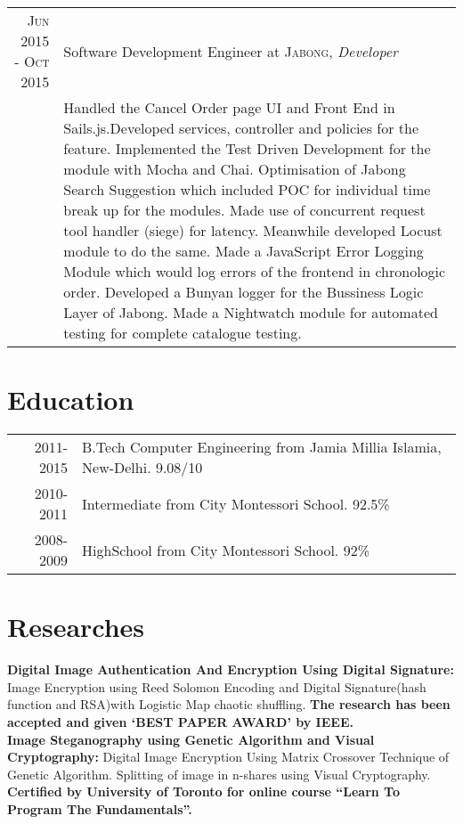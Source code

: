 \documentclass[a4paper,10pt]{article}
\begin{document}
\begin{tabular}{r|p{11cm}}
\textsc{Jun 2015 - Oct 2015} & Software Development Engineer at \textsc{Jabong}, \newline \emph{Developer}\\&\footnotesize{Handled the Cancel Order page UI and Front End in Sails.js.Developed services, controller and policies for the feature.\newline
Implemented the Test Driven Development for the module with Mocha and Chai.\newline
Optimisation of Jabong Search Suggestion which included POC for individual time break up for the modules. Made use of
concurrent request tool handler (siege) for latency. Meanwhile developed Locust module to do the same.\newline
Made a JavaScript Error Logging Module which would log errors of the frontend in chronologic order.\newline
Developed a Bunyan logger for the Bussiness Logic Layer of Jabong.\newline
Made a Nightwatch module for automated testing for complete catalogue testing.\newline}
\end{tabular}
\section{Education}
\begin{tabular}{rl}
 \textsc{2011-2015} & B.Tech Computer Engineering  from Jamia Millia Islamia, New-Delhi. 9.08/10 \normalsize\\
\textsc{2010-2011} &Intermediate from City Montessori School.  92.5\% \normalsize\\
\textsc{2008-2009} & HighSchool from City Montessori School.  92\% \normalsize\\
\end{tabular}

\section{Researches}
\textbf{Digital Image Authentication And Encryption Using Digital Signature:} \normalsize Image Encryption using Reed Solomon
Encoding and Digital Signature(hash function and RSA)with Logistic Map chaotic shuffling. \textbf{The research has been accepted and given ‘BEST PAPER AWARD’ by IEEE.} \\
\textbf{Image Steganography using Genetic Algorithm and Visual Cryptography: } \normalsize Digital Image Encryption Using Matrix
Crossover Technique of Genetic Algorithm. Splitting of image in n-shares using Visual Cryptography. \\
\textbf{Certified by University of Toronto for online course “Learn To Program The Fundamentals”.}
\end{document}
